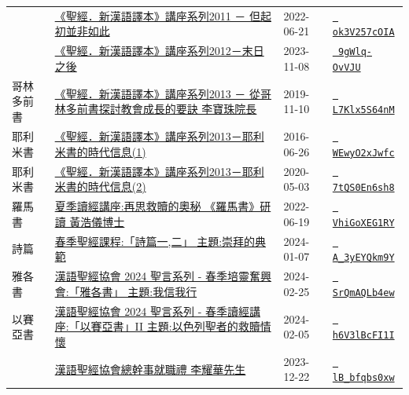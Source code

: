 \documentclass{book}
\begin{document}
{\begin{xltabular}{\textwidth}{|p{0.15\textwidth} p{0.6\textwidth}|p{0.07\textwidth} p{0.1\textwidth}|}
    & \hyperref[sec:ok3V257cOIA]{《聖經．新漢語譯本》講座系列2011 － 但起初並非如此} & 2022-06-21 & \href{https://youtube.com/watch?v=ok3V257cOIA}{\texttt{ ok3V257cOIA}} \\
    & \hyperref[sec:9gWlq_OvVJU]{《聖經．新漢語譯本》講座系列2012－末日之後} & 2023-11-08 & \href{https://youtube.com/watch?v=9gWlq-OvVJU}{\texttt{ 9gWlq-OvVJU}} \\
哥林多前書   & \hyperref[sec:L7Klx5S64nM]{《聖經．新漢語譯本》講座系列2013 － 從哥林多前書探討教會成長的要訣 李寶珠院長} & 2019-11-10 & \href{https://youtube.com/watch?v=L7Klx5S64nM}{\texttt{ L7Klx5S64nM}} \\
耶利米書   & \hyperref[sec:WEwyO2xJwfc]{《聖經．新漢語譯本》講座系列2013－耶利米書的時代信息(1)} & 2016-06-26 & \href{https://youtube.com/watch?v=WEwyO2xJwfc}{\texttt{ WEwyO2xJwfc}} \\
耶利米書   & \hyperref[sec:7tQS0En6sh8]{《聖經．新漢語譯本》講座系列2013－耶利米書的時代信息(2)} & 2020-05-03 & \href{https://youtube.com/watch?v=7tQS0En6sh8}{\texttt{ 7tQS0En6sh8}} \\
羅馬書   & \hyperref[sec:VhiGoXEG1RY]{夏季讀經講座:再思救贖的奧秘 《羅馬書》研讀 黃浩儀博士} & 2022-06-19 & \href{https://youtube.com/watch?v=VhiGoXEG1RY}{\texttt{ VhiGoXEG1RY}} \\
詩篇   & \hyperref[sec:A_3yEYQkm9Y]{春季聖經課程:「詩篇一,二」 主題:崇拜的典範} & 2024-01-07 & \href{https://youtube.com/watch?v=A_3yEYQkm9Y}{\texttt{ A\_3yEYQkm9Y}} \\
雅各書   & \hyperref[sec:SrQmAQLb4ew]{漢語聖經協會 2024 聖言系列 - 春季培靈奮興會:「雅各書」 主題:我信我行} & 2024-02-25 & \href{https://youtube.com/watch?v=SrQmAQLb4ew}{\texttt{ SrQmAQLb4ew}} \\
以賽亞書   & \hyperref[sec:h6V3lBcFI1I]{漢語聖經協會 2024 聖言系列 - 春季讀經講座:「以賽亞書」II 主題:以色列聖者的救贖情懷} & 2024-02-05 & \href{https://youtube.com/watch?v=h6V3lBcFI1I}{\texttt{ h6V3lBcFI1I}} \\
    & \hyperref[sec:lB_bfqbs0xw]{漢語聖經協會總幹事就職禮 李耀華先生} & 2023-12-22 & \href{https://youtube.com/watch?v=lB_bfqbs0xw}{\texttt{ lB\_bfqbs0xw}} \\
\end{xltabular}
}
\newpage
\end{document}
